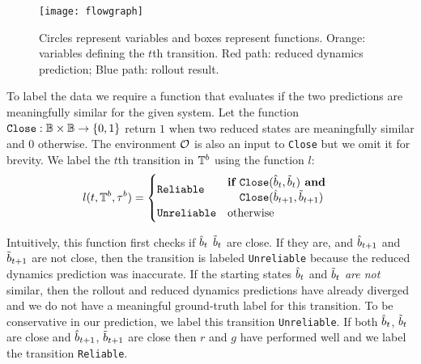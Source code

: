 \begin{figure}[h]
    \centering
    \texttt{[image: flowgraph]}
    \caption{Circles represent variables and boxes represent functions. Orange: variables defining the $t$th transition. Red path: reduced dynamics prediction; Blue path: rollout result.}
    \label{fig:flowgraph}
\end{figure}

To label the data we require a function that evaluates if the two predictions are meaningfully similar for the given system. Let the function $\texttt{Close}:\mathcal{\mathbb{B}} \times \mathbb{B} \rightarrow \{0,1\}$ return $1$ when two reduced states are meaningfully similar and $0$ otherwise. The environment $\mathcal{O}$ is also an input to \texttt{Close} but we omit it for brevity. We label the $t$th transition in $\mathbb{T}^b$ using the function $l$:
\begin{equation}
    \begin{aligned}
    l(t,\mathbb{T}^b,\tau^b) &= \begin{cases} 
        \texttt{Reliable}   &  \begin{aligned}\textbf{if } & \texttt{Close}(\hat{b}_t, \tilde{b}_t) \textbf{ and} \\ 
                                                           & \texttt{Close}(\hat{b}_{t+1}, \tilde{b}_{t+1})\end{aligned} \\
        \texttt{Unreliable} & \mbox{otherwise} \end{cases}
    \end{aligned}
    \label{eqn:labeling}
\end{equation}

Intuitively, this function first checks if $\hat{b}_t$ $\tilde{b}_t$ are close. If they are, and $\hat{b}_{t+1}$ and $\tilde{b}_{t+1}$ are not close, then the transition is labeled \texttt{Unreliable} because the reduced dynamics prediction was inaccurate. If the starting states $\hat{b}_t$ and $\tilde{b}_t$ \textit{are not} similar, then the rollout and reduced dynamics predictions have already diverged and we do not have a meaningful ground-truth label for this transition. To be conservative in our prediction, we label this transition \texttt{Unreliable}. If both $\hat{b}_t$, $\tilde{b}_t$ are close and $\hat{b}_{t+1}$, $\tilde{b}_{t+1}$ are close then $r$ and $g$ have performed well and we label the transition \texttt{Reliable}.

